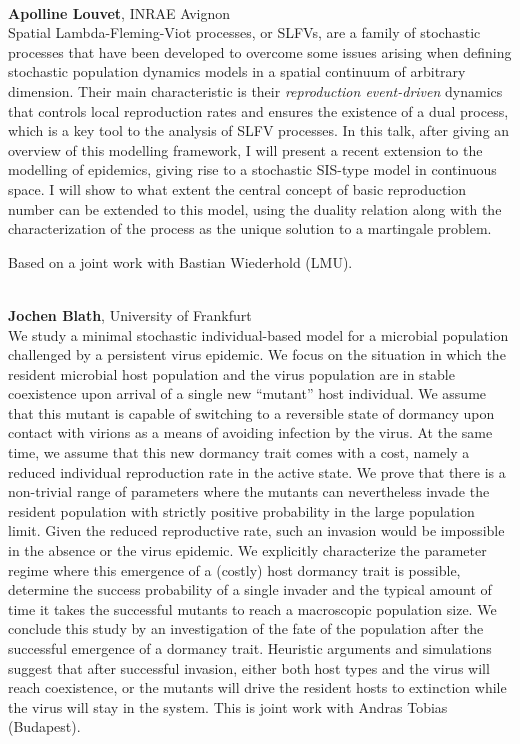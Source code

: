 \documentclass[12pt,a4paper]{article}
\begin{document}
\\[1ex]{ \large \textbf{ Apolline Louvet}}, INRAE Avignon \\[2ex] Spatial Lambda-Fleming-Viot processes, or SLFVs, are a family of stochastic processes that have been developed to overcome some issues arising when defining stochastic population dynamics models in a spatial continuum of arbitrary dimension. Their main characteristic is their {\em reproduction event-driven} dynamics that controls local reproduction rates and ensures the existence of a dual process, which is a key tool to the analysis of SLFV processes. In this talk, after giving an overview of this modelling framework, I will present a recent extension to the modelling of epidemics, giving rise to a stochastic SIS-type model in continuous space. I will show to what extent the central concept of basic reproduction number can be extended to this model, using the duality relation along with the characterization of the process as the unique solution to a martingale problem. 
 
 Based on a joint work with Bastian Wiederhold (LMU). 

\bigskip\bigskip

\\[1ex]{ \large \textbf{ Jochen Blath}}, University of Frankfurt \\[2ex] We study a minimal stochastic individual-based model for a microbial population challenged by a persistent virus epidemic. We focus on the situation in which the resident microbial host population and the virus population are in stable coexistence upon arrival of a single new “mutant” host individual. We assume that this mutant is capable of switching to a reversible state of dormancy upon contact with virions as a means of avoiding infection by the virus. At the same time, we assume that this new dormancy trait comes with a cost, namely a reduced individual reproduction rate in the active state. We prove that there is a non-trivial range of parameters where the mutants can nevertheless invade the resident population with strictly positive probability in the large population limit.  Given the reduced reproductive rate, such an invasion would be impossible in the absence or the virus epidemic. We explicitly characterize the parameter regime where this emergence of a (costly) host dormancy trait is possible, determine the success probability of a single invader and the typical amount of time it takes the successful mutants to reach a macroscopic population size. We conclude this study by an investigation of the fate of the population after the successful emergence of a dormancy trait. Heuristic arguments and simulations suggest that after successful invasion, either both host types and the virus will reach coexistence, or the mutants will drive the resident hosts to extinction while the virus will stay in the system. This is joint work with Andras Tobias (Budapest). 
\end{document}
